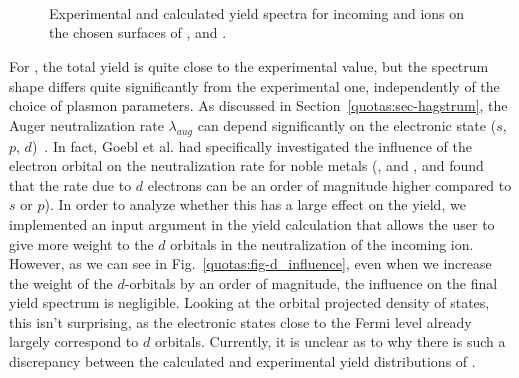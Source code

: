 \begin{refsection}
\begin{figure}[!ht] 
    \centering 
    \begin{subfigure}[t]{0.49\textwidth} 
        \centering 
         
    \end{subfigure}%
    ~  
    \begin{subfigure}[t]{0.49\textwidth} 
        \centering 
         
    \end{subfigure} 
    \begin{subfigure}[t]{0.49\textwidth} 
        \centering 
         
    \end{subfigure}%
    ~  
    \begin{subfigure}[t]{0.49\textwidth} 
        \centering 
         
    \end{subfigure} 
    \begin{subfigure}[t]{0.49\textwidth} 
        \centering 
         
    \end{subfigure}%
    ~  
    \begin{subfigure}[t]{0.49\textwidth} 
        \centering 
         
    \end{subfigure} 
    \caption{\label{quotas:fig-metals_results2} Experimental and calculated 
yield spectra for incoming  and  ions on the chosen surfaces of ,  and .} 
\end{figure} \clearpage 
 
For , the total yield is quite close to the experimental value, 
but the spectrum shape differs quite significantly from the experimental one, 
independently of the choice of plasmon parameters. As discussed in 
Section~\ref{quotas:sec-hagstrum}, the Auger neutralization rate 
$\lambda_{aug}$ can depend significantly on the electronic state ($s$, $p$, 
$d$)~\cite{Goebl2011}. In fact, Goebl et al. had specifically investigated the 
influence of the electron orbital on the neutralization rate for noble metals 
(,  and , and found that the rate due to $d$ electrons 
can be an order of magnitude higher compared to $s$ or $p$). In order to 
analyze whether this has a large effect on the yield, we implemented an input 
argument in the yield calculation that allows the user to give more weight to 
the $d$ orbitals in the neutralization of the incoming ion. However, as we can 
see in Fig.~\ref{quotas:fig-d_influence}, even when we increase the weight of 
the $d$-orbitals by an order of magnitude, the influence on the final yield 
spectrum is negligible. Looking at the orbital projected density of states, 
this isn't surprising, as the electronic states close to the Fermi level 
already largely correspond to $d$ orbitals. Currently, it is unclear as to why 
there is such a discrepancy between the calculated and experimental yield 
distributions of . 


\end{refsection}
